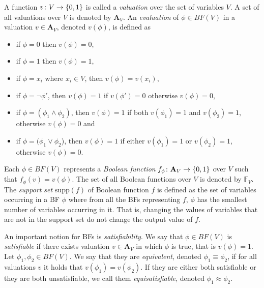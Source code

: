 \documentclass[
  digital, %
  twoside, %
  table,   %
  nolof,     %
  nolot,     %
]{fithesis3}
\let\setbuilder\set
\newcommand{\simpleset}[1]{\{{#1}\}}
\renewcommand{\set}[1]{\normalexpandarg\IfSubStr{#1}{|}{\setbuilder{#1}}{\simpleset{#1}}}
\theoremstyle{definition}
\theoremstyle{remark}
\newcommand{\BF}[1]{BF(#1)}
\newcommand{\valtns}[1]{\mathbf{A}_{#1}}
\newcommand{\BFuncs}[1]{\mathbb{F}_{#1}}
\newcommand{\supp}[1]{\text{supp}(#1)}
\begin{document}
A function $v\colon V \to \set{0,1}$ is called a \emph{valuation} over the set of variables $V$. A set of all valuations over $V$ is denoted by $\valtns{V}$. An \emph{evaluation} of $\phi \in \BF{V}$ in a valuation $v \in \valtns{V}$, denoted $v(\phi)$, is defined as %
\begin{itemize}
    \item if $\phi = 0$ then $v(\phi) = 0$,
    \item if $\phi = 1$ then $v(\phi) = 1$,
    \item if $\phi = x_i$ where $x_i \in V$, then $v(\phi) = v(x_i)$,
    \item if $\phi = \neg\phi'$, then $v(\phi) = 1$ if $v(\phi') = 0$ otherwise $v(\phi) = 0$,
    \item if $\phi = (\phi_1 \land \phi_2)$, then $v(\phi) = 1$ if both $v(\phi_1) = 1$ and $v(\phi_2) = 1$, otherwise $v(\phi) = 0$ and
    \item if $\phi = (\phi_1 \lor \phi_2$), then $v(\phi) = 1$ if either $v(\phi_1) = 1$ or $v(\phi_2) = 1$, otherwise $v(\phi) = 0$.
\end{itemize}
Each $\phi \in \BF{V}$ represents a \emph{Boolean function} $f_{\phi}\colon \valtns{V} \to \set{0,1}$ over $V$ such that $f_{\phi}(v) = v(\phi)$. The set of all Boolean functions over $V$ is denoted by $\BFuncs{V}$. The \emph{support set} $\supp{f}$ of Boolean function $f$ is defined as the set of variables occurring in a BF $\phi$ where from all the BFs representing $f$, $\phi$ has the smallest number of variables occurring in it. That is, changing the values of variables that are not in the support set do not change the output value of $f$.


An important notion for BFs is \emph{satisfiability}. We say that $\phi \in \BF{V}$ is \emph{satisfiable} if there exists valuation $v \in \valtns{V}$ in which $\phi$ is true, that is $v(\phi) = 1$. Let $\phi_1, \phi_2 \in \BF{V}$. We say that they are \emph{equivalent}, denoted $\phi_1 \equiv \phi_2$, if for all valuations $v$ it holds that $v(\phi_1) = v(\phi_2)$. If they are either both satisfiable or they are both unsatisfiable, we call them \emph{equisatisfiable}, denoted $\phi_1 \approx \phi_2$. %
\end{document}
